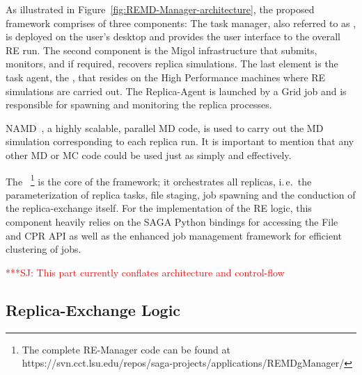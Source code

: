 \documentclass{rspublic}
\newcommand{\alnote}[1]{ {\textcolor{blue} { ***AL: #1 }}}
\newcommand{\jhanote}[1]{ {\textcolor{red} { ***SJ: #1 }}}
\newcommand{\alnote}[1]{}
\newcommand{\jhanote}[1]{}
\newcommand{\replicaagent}[1]{Replica-Agent }
\newcommand{\remanager}[1]{RE-Manager }
\begin{document}
As illustrated in Figure~\ref{fig:REMD-Manager-architecture}, the
proposed framework comprises of three components: The task manager,
also referred to as \emph{\remanager}, is deployed on the user's
desktop and provides the user interface to the overall RE run. The
second component is the Migol infrastructure that submits, monitors,
and if required, recovers replica simulations.  The last element is
the task agent, the \textit{\replicaagent},
that resides on the High Performance machines where RE simulations
are carried out. The \replicaagent\ is launched by a Grid job and is
responsible for spawning and monitoring the replica processes. 

NAMD~\citep{Phillips:2005gd}, a highly scalable, parallel MD
code, is used to carry out the MD simulation corresponding to each
replica run. It is important to mention that any other MD or MC code 
could be used just as simply and effectively.

The \emph{\remanager}~\footnote{The complete \remanager\ code can be found
at https://svn.cct.lsu.edu/repos/saga-projects/applications/REMDgManager/} 
is the core of the framework; it orchestrates all replicas, i.\,e.\ 
the parameterization of replica tasks, file staging, job spawning and 
the conduction of the replica-exchange itself. For the implementation 
of the RE logic, this component heavily relies on the SAGA Python bindings 
for accessing the File and CPR API as well as the enhanced job management 
framework for efficient clustering of jobs.

                                  

\jhanote{This part currently conflates architecture and control-flow}
                       
\subsection{Replica-Exchange Logic}
                                            
\end{document}
